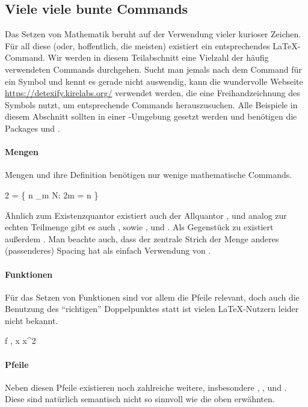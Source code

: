 \subsection{Viele viele bunte Commands}
Das Setzen von Mathematik beruht auf der Verwendung vieler kurioser Zeichen.
Für all diese (oder, hoffentlich, die meisten) existiert ein entsprechendes \LaTeX{}-Command.
Wir werden in diesem Teilabschnitt eine Vielzahl der häufig verwendeten Commands durchgehen.
Sucht man jemals nach dem Command für ein Symbol und kennt es gerade nicht auswendig, kann die wundervolle Webseite \url{https://detexify.kirelabs.org/} verwendet werden, die eine Freihandzeichnung des Symbols nutzt, um entsprechende Commands herauszusuchen.
Alle Beispiele in diesem Abschnitt sollten in einer -Umgebung gesetzt werden und benötigen die Packages  und .

\paragraph{Mengen} Mengen und ihre Definition benötigen nur wenige mathematische Commands.
\begin{latexlisting}
	2 = \{ n \in {} \mid \exists_{m \in N}: 2m = n \} \subsetneq {} 
\end{latexlisting}
Ähnlich zum Existenzquantor  existiert auch der Allquantor , und analog zur echten Teilmenge  gibt es auch ,  sowie ,  und .
Als Gegenstück zu  existiert außerdem .
Man beachte auch, dass der zentrale Strich  der Menge anderes (passenderes) Spacing hat als einfach Verwendung von \key{|}.

\paragraph{Funktionen} Für das Setzen von Funktionen sind vor allem die Pfeile relevant, doch auch die Benutzung des \enquote{richtigen} Doppelpunktes statt \key{:} ist vielen \LaTeX{}-Nutzern leider nicht bekannt.
\begin{latexlisting}
	f\colon {} \to {}, x \mapsto x^2 
\end{latexlisting}

\paragraph{Pfeile} Neben diesen Pfeile existieren noch zahlreiche weitere, insbesondere , ,  und .
Diese sind natürlich semantisch nicht so sinnvoll wie die oben erwähnten.

